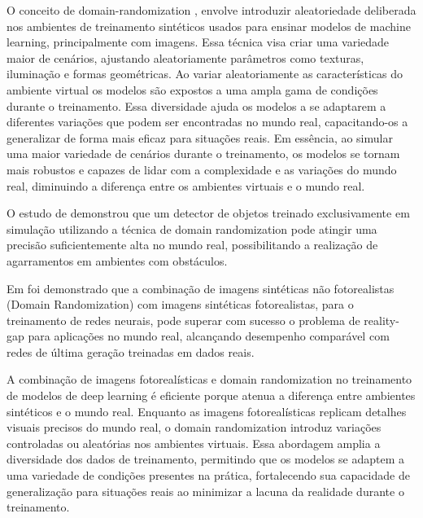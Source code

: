 O conceito de domain-randomization \citep{domain-random}, envolve introduzir aleatoriedade deliberada nos ambientes de treinamento sintéticos usados para ensinar modelos de machine learning, principalmente com imagens. Essa técnica visa criar uma variedade maior de cenários, ajustando aleatoriamente parâmetros como texturas, iluminação e formas geométricas. Ao variar aleatoriamente as características do ambiente virtual os modelos são expostos a uma ampla gama de condições durante o treinamento. Essa diversidade ajuda os modelos a se adaptarem a diferentes variações que podem ser encontradas no mundo real, capacitando-os a generalizar de forma mais eficaz para situações reais. Em essência, ao simular uma maior variedade de cenários durante o treinamento, os modelos se tornam mais robustos e capazes de lidar com a complexidade e as variações do mundo real, diminuindo a diferença entre os ambientes virtuais e o mundo real.

O estudo de \citet{domain-random} demonstrou que um detector de objetos treinado exclusivamente em simulação utilizando a técnica de domain randomization pode atingir uma precisão suficientemente alta no mundo real, possibilitando a realização de agarramentos em ambientes com obstáculos. 

Em \citet{objectPose} foi demonstrado que a combinação de imagens sintéticas não fotorealistas (Domain Randomization) com imagens sintéticas fotorealistas, para o treinamento de redes neurais, pode superar com sucesso o problema de reality-gap para aplicações no mundo real, alcançando desempenho comparável com redes de última geração treinadas em dados reais.

A combinação de imagens fotorealísticas e domain randomization no treinamento de modelos de deep learning é eficiente porque atenua a diferença entre ambientes sintéticos e o mundo real. Enquanto as imagens fotorealísticas replicam detalhes visuais precisos do mundo real, o domain randomization introduz variações controladas ou aleatórias nos ambientes virtuais. Essa abordagem amplia a diversidade dos dados de treinamento, permitindo que os modelos se adaptem a uma variedade de condições presentes na prática, fortalecendo sua capacidade de generalização para situações reais ao minimizar a lacuna da realidade durante o treinamento.


